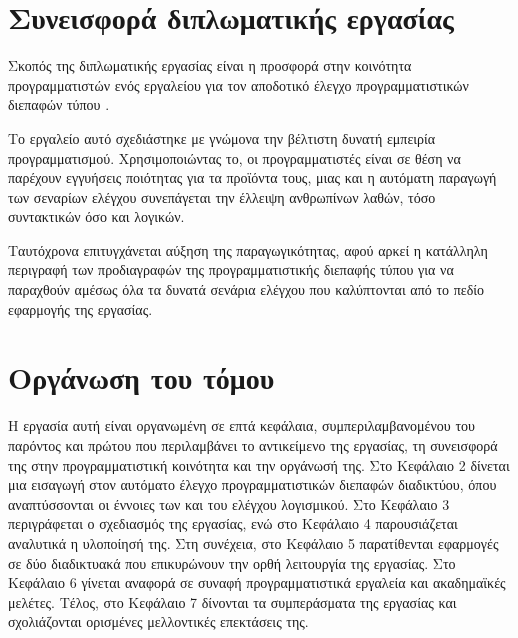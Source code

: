 \section{Συνεισφορά διπλωματικής εργασίας}
Σκοπός της διπλωματικής εργασίας είναι η προσφορά στην κοινότητα προγραμματιστών  ενός εργαλείου
για τον αποδοτικό έλεγχο προγραμματιστικών διεπαφών τύπου .

Το εργαλείο αυτό σχεδιάστηκε με γνώμονα την βέλτιστη δυνατή εμπειρία προγραμματισμού.
Χρησιμοποιώντας το, οι προγραμματιστές είναι σε θέση να παρέχουν εγγυήσεις ποιότητας για τα προϊόντα τους,
μιας και η αυτόματη παραγωγή των σεναρίων ελέγχου συνεπάγεται την έλλειψη ανθρωπίνων λαθών, τόσο συντακτικών όσο και λογικών.

Ταυτόχρονα επιτυγχάνεται αύξηση της παραγωγικότητας, 
αφού αρκεί η κατάλληλη περιγραφή των προδιαγραφών της προγραμματιστικής διεπαφής τύπου  για να παραχθούν αμέσως όλα τα δυνατά σενάρια ελέγχου που καλύπτονται από το πεδίο εφαρμογής της εργασίας.

\section{Οργάνωση του τόμου}
Η εργασία αυτή είναι οργανωμένη σε επτά κεφάλαια, συμπεριλαμβανομένου του παρόντος και πρώτου που περιλαμβάνει το αντικείμενο της εργασίας,
τη συνεισφορά της στην προγραμματιστική κοινότητα και την οργάνωσή της.
Στο Κεφάλαιο 2 δίνεται μια εισαγωγή στον αυτόματο έλεγχο προγραμματιστικών διεπαφών διαδικτύου,
όπου αναπτύσσονται οι έννοιες των  και του ελέγχου λογισμικού. 
Στο Κεφάλαιο 3 περιγράφεται ο σχεδιασμός της εργασίας, ενώ στο Κεφάλαιο 4 παρουσιάζεται αναλυτικά η υλοποίησή της. 
Στη συνέχεια, στο Κεφάλαιο 5 παρατίθενται εφαρμογές σε δύο διαδικτυακά  που επικυρώνουν την ορθή λειτουργία της εργασίας.
Στο Κεφάλαιο 6 γίνεται αναφορά σε συναφή προγραμματιστικά εργαλεία και ακαδημαϊκές μελέτες.
Τέλος, στο Κεφάλαιο 7 δίνονται τα συμπεράσματα της εργασίας και σχολιάζονται ορισμένες μελλοντικές επεκτάσεις της.